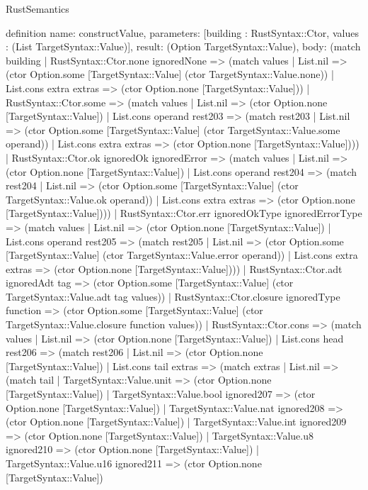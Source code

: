 \begin{lexlean}{RustSemantics}
\begin{semanticmodule}
definition{
  name: constructValue,
  parameters: [building : RustSyntax::Ctor, values : (List TargetSyntax::Value)],
  result: (Option TargetSyntax::Value),
  body: (match building
    | RustSyntax::Ctor.none ignoredNone => (match values
      | List.nil => (ctor Option.some [TargetSyntax::Value] (ctor TargetSyntax::Value.none))
      | List.cons extra extras => (ctor Option.none [TargetSyntax::Value]))
    | RustSyntax::Ctor.some => (match values
      | List.nil => (ctor Option.none [TargetSyntax::Value])
      | List.cons operand rest203 => (match rest203
        | List.nil => (ctor Option.some [TargetSyntax::Value] (ctor TargetSyntax::Value.some operand))
        | List.cons extra extras => (ctor Option.none [TargetSyntax::Value])))
    | RustSyntax::Ctor.ok ignoredOk ignoredError => (match values
      | List.nil => (ctor Option.none [TargetSyntax::Value])
      | List.cons operand rest204 => (match rest204
        | List.nil => (ctor Option.some [TargetSyntax::Value] (ctor TargetSyntax::Value.ok operand))
        | List.cons extra extras => (ctor Option.none [TargetSyntax::Value])))
    | RustSyntax::Ctor.err ignoredOkType ignoredErrorType => (match values
      | List.nil => (ctor Option.none [TargetSyntax::Value])
      | List.cons operand rest205 => (match rest205
        | List.nil => (ctor Option.some [TargetSyntax::Value] (ctor TargetSyntax::Value.error operand))
        | List.cons extra extras => (ctor Option.none [TargetSyntax::Value])))
    | RustSyntax::Ctor.adt ignoredAdt tag => (ctor Option.some [TargetSyntax::Value] (ctor TargetSyntax::Value.adt tag values))
    | RustSyntax::Ctor.closure ignoredType function => (ctor Option.some [TargetSyntax::Value] (ctor TargetSyntax::Value.closure function values))
    | RustSyntax::Ctor.cons => (match values
      | List.nil => (ctor Option.none [TargetSyntax::Value])
      | List.cons head rest206 => (match rest206
        | List.nil => (ctor Option.none [TargetSyntax::Value])
        | List.cons tail extras => (match extras
          | List.nil => (match tail
            | TargetSyntax::Value.unit => (ctor Option.none [TargetSyntax::Value])
            | TargetSyntax::Value.bool ignored207 => (ctor Option.none [TargetSyntax::Value])
            | TargetSyntax::Value.nat ignored208 => (ctor Option.none [TargetSyntax::Value])
            | TargetSyntax::Value.int ignored209 => (ctor Option.none [TargetSyntax::Value])
            | TargetSyntax::Value.u8 ignored210 => (ctor Option.none [TargetSyntax::Value])
            | TargetSyntax::Value.u16 ignored211 => (ctor Option.none [TargetSyntax::Value])
}
\end{semanticmodule}
\end{lexlean}
